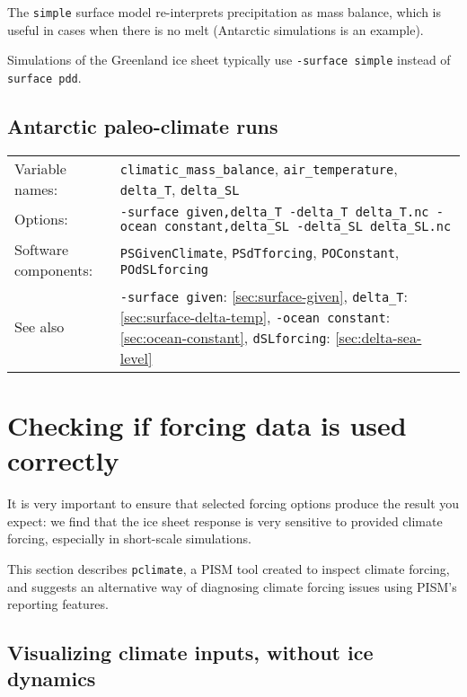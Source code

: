 \documentclass[titlepage,letterpaper,final]{scrartcl}
\begin{document}
The \texttt{simple} surface model re-interprets precipitation as mass balance, which is useful in cases when there is no melt (Antarctic simulations is an example).

Simulations of the Greenland ice sheet typically use \texttt{-surface~simple} instead of \texttt{surface~pdd}.

\subsection{Antarctic paleo-climate runs}
\label{sec:use-case-antarctica-paleo}

\begin{center}
  \begin{tabular}{lp{}}
    \toprule
    Variable names: & \texttt{climatic_mass_balance}, \texttt{air_temperature}, \texttt{delta_T}, \texttt{delta_SL}\\
    Options: & \texttt{-surface given,delta_T \mbox{-delta_T delta_T.nc}
      \mbox{-ocean constant,delta_SL} -delta_SL delta_SL.nc} \\
    Software   components:  &   \texttt{PSGivenClimate},  \texttt{PSdTforcing},
    \texttt{POConstant}, \texttt{POdSLforcing}\\
    See   also    &   \texttt{-surface~given}:   \ref{sec:surface-given},
    \texttt{delta_T}: \ref{sec:surface-delta-temp}, \texttt{-ocean~constant}: \ref{sec:ocean-constant}, \texttt{dSLforcing}: \ref{sec:delta-sea-level}\\
    \bottomrule
  \end{tabular}
\end{center}

\section{Checking if forcing data is used correctly}
\label{sec:checking-forcing}

It is very important to ensure that selected forcing options produce the result you expect: we find that the ice sheet response is very sensitive to provided climate forcing, especially in short-scale simulations.

This section describes \texttt{pclimate}, a PISM tool created to inspect climate forcing, and suggests an alternative way of diagnosing climate forcing issues using PISM's reporting features.

\subsection{Visualizing climate inputs, without ice dynamics}
\label{sec:pclimate}
\end{document}
